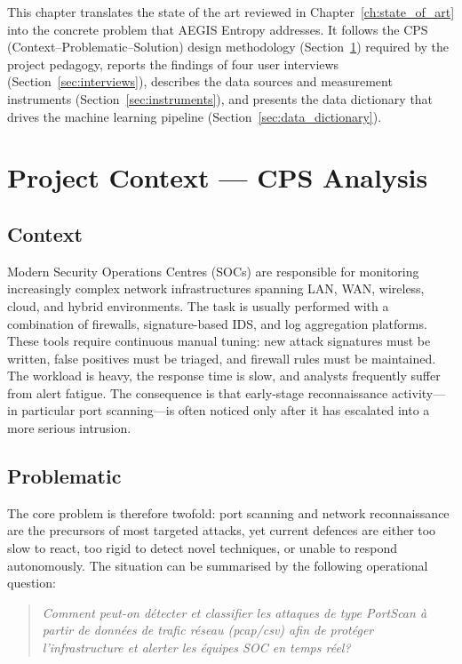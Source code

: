 \documentclass[12pt,a4paper]{report}
\begin{document}
This chapter translates the state of the art reviewed in Chapter~\ref{ch:state_of_art} into the concrete problem that AEGIS Entropy addresses. It follows the CPS (Context--Problematic--Solution) design methodology (Section~\ref{sec:cps}) required by the project pedagogy, reports the findings of four user interviews (Section~\ref{sec:interviews}), describes the data sources and measurement instruments (Section~\ref{sec:instruments}), and presents the data dictionary that drives the machine learning pipeline (Section~\ref{sec:data_dictionary}).

\section{Project Context --- CPS Analysis}\label{sec:cps}

\subsection{Context}

Modern Security Operations Centres (SOCs) are responsible for monitoring increasingly complex network infrastructures spanning LAN, WAN, wireless, cloud, and hybrid environments. The task is usually performed with a combination of firewalls, signature-based IDS, and log aggregation platforms. These tools require continuous manual tuning: new attack signatures must be written, false positives must be triaged, and firewall rules must be maintained. The workload is heavy, the response time is slow, and analysts frequently suffer from alert fatigue. The consequence is that early-stage reconnaissance activity---in particular port scanning---is often noticed only after it has escalated into a more serious intrusion.

\subsection{Problematic}

The core problem is therefore twofold: port scanning and network reconnaissance are the precursors of most targeted attacks, yet current defences are either too slow to react, too rigid to detect novel techniques, or unable to respond autonomously. The situation can be summarised by the following operational question:

\begin{quote}
\textit{Comment peut-on d\'{e}tecter et classifier les attaques de type PortScan \`{a} partir de donn\'{e}es de trafic r\'{e}seau (pcap/csv) afin de prot\'{e}ger l'infrastructure et alerter les \'{e}quipes SOC en temps r\'{e}el?}
\end{quote}
\end{document}
